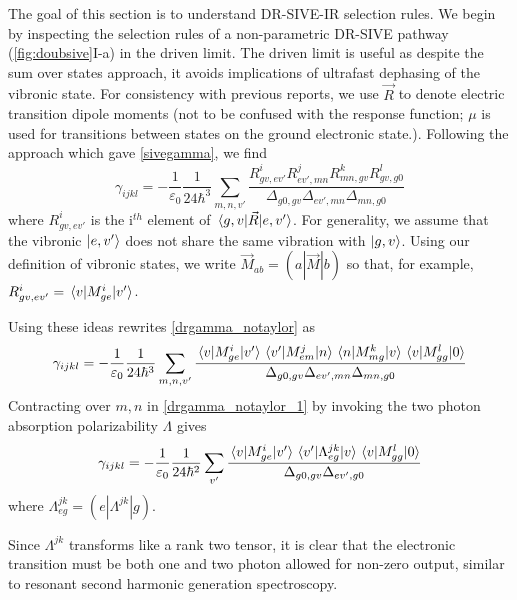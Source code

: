 \documentclass[aip, jcp, reprint, twocolumn]{revtex4-2}
\begin{document}
The goal of this section is to understand DR-SIVE-IR selection rules.
We begin by inspecting the selection rules of a non-parametric DR-SIVE pathway (\autoref{fig:doubsive}I-a) in the driven limit. 
The driven limit is useful as despite the sum over states approach, it avoids implications of ultrafast dephasing of the vibronic state.\cite{Cho2001} 
For consistency with previous reports, we use $\vec{R}$ to denote electric transition dipole moments (not to be confused with the response function; $\mu$ is used for transitions between states on the ground electronic state.). \cite{Ziegler1974}
Following the approach which gave \autoref{sivegamma}, we find
\begin{equation}\label{drgamma_notaylor}
	\gamma_{ijkl} = -\frac{1}{\varepsilon_0} \frac{1}{24 \hbar^3} \sum_{m,n,v'} \frac{
		R^{i}_{gv,ev'} 
		R^{j}_{ev',mn} 
		R^{k}_{mn,gv} 
		R^{l}_{gv,g0} 
	}{\Delta_{g0,gv}
		\Delta_{ev', mn}
		\Delta_{mn, g0}
	}
\end{equation}
where $R^{i}_{gv,ev'}$ is the i$^{th}$ element of $\mel{g,v}{\vec{R}}{e,v'}$.
For generality, we assume that the vibronic  $\ket{e,v'}$ does not share the same vibration with $\ket{g,v}$. \cite{Ziegler1988}
Using our definition of vibronic states, we write $\vec{M}_{ab} = (a|\vec{M}|b)$ so that, for example,
$R^{i}_{gv,ev'} = \mel{v}{M^i_{ge}}{v'}$.\cite{Albrecht1960}
\begin{widetext}
Using these ideas rewrites \autoref{drgamma_notaylor} as
\begin{equation}\label{drgamma_notaylor_1}
	\gamma_{ijkl} = -\frac{1}{\varepsilon_0} \frac{1}{24 \hbar^3} \sum_{m,n,v'} \frac{
		\mel{v}{M^{i}_{ge}}{v'} 
		\mel{v'}{M^{j}_{em}}{n}
		\mel{n}{M^{k}_{mg} }{v}
		\mel{v}{M^{l}_{gg}}{0}
	}{\Delta_{g0,gv}
		\Delta_{ev', mn}
		\Delta_{mn, g0}	}
\end{equation}
Contracting over $m,n$ in \autoref{drgamma_notaylor_1} by invoking the two photon absorption polarizability $\Lambda$ gives \cite{McClain1977, Simpson2004, Olson2018}
\begin{equation}\label{drgamma_alpha_0}
	\gamma_{ijkl} = -\frac{1}{\varepsilon_0} \frac{1}{24 \hbar^2} \sum_{v'} \frac{
		\mel{v}{M^{i}_{ge}}{v'} 
		\mel{v'}{\Lambda^{jk}_{eg}}{v}
		\mel{v}{M^{l}_{gg}}{0}
	}{\Delta_{g0,gv}
		\Delta_{ev', g0}
	}
\end{equation}
where ${\Lambda^{jk}_{eg}} = (e|\Lambda^{jk}|g)$. 
\end{widetext}
Since $\Lambda^{jk}$ transforms like a rank two tensor, it is clear that the electronic transition must be both one and two photon allowed for non-zero output, similar to resonant second harmonic generation spectroscopy. \cite{Heinz1982, Nguyen1986, Simpson2004}
\end{document}
